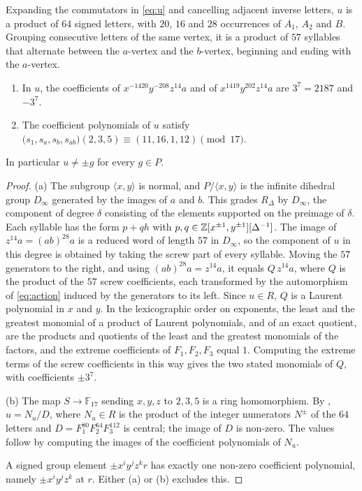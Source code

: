 \documentclass[11pt,colorlinks]{charlie}
\newcommand{\F}{\mathbb{F}}
\newcommand{\Dinf}{D_\infty}
\begin{document}
Expanding the commutators in \eqref{eq:u} and cancelling adjacent inverse letters, $u$ is a product of $64$ signed letters, with $20$, $16$ and $28$ occurrences of $A_1$, $A_2$ and $B$. Grouping consecutive letters of the same vertex, it is a product of $57$ syllables that alternate between the $a$-vertex and the $b$-vertex, beginning and ending with the $a$-vertex.

\begin{proposition}\label{prop:nontrivial}
\begin{enumerate}[label=\textup{(\alph*)}]
\item In $u$, the coefficients of $x^{-1420}y^{-208}z^{14}a$ and of $x^{1419}y^{202}z^{14}a$ are $3^7=2187$ and $-3^7$.
\item The coefficient polynomials of $u$ satisfy $\bigl(s_1,s_a,s_b,s_{ab}\bigr)(2,3,5)\equiv(11,16,1,12)\pmod{17}$.
\end{enumerate}
In particular $u\ne\pm g$ for every $g\in P$.
\end{proposition}

\begin{proof}
(a) The subgroup $\langle x,y\rangle$ is normal, and $P/\langle x,y\rangle$ is the infinite dihedral group $\Dinf$ generated by the images of $a$ and $b$. This grades $R_\Delta$ by $\Dinf$, the component of degree $\delta$ consisting of the elements supported on the preimage of $\delta$. Each syllable has the form $p+qh$ with $p,q\in\mathbb{Z}[x^{\pm1},y^{\pm1}][\Delta^{-1}]$. The image of $z^{14}a=(ab)^{28}a$ is a reduced word of length $57$ in $\Dinf$, so the component of $u$ in this degree is obtained by taking the screw part of every syllable. Moving the $57$ generators to the right, and using $(ab)^{28}a=z^{14}a$, it equals $Q\,z^{14}a$, where $Q$ is the product of the $57$ screw coefficients, each transformed by the automorphism of \eqref{eq:action} induced by the generators to its left. Since $u\in R$, $Q$ is a Laurent polynomial in $x$ and $y$. In the lexicographic order on exponents, the least and the greatest monomial of a product of Laurent polynomials, and of an exact quotient, are the products and quotients of the least and the greatest monomials of the factors, and the extreme coefficients of $F_1,F_2,F_3$ equal $1$. Computing the extreme terms of the screw coefficients in this way gives the two stated monomials of $Q$, with coefficients $\pm3^7$.

(b) The map $S\to\F_{17}$ sending $x,y,z$ to $2,3,5$ is a ring homomorphism. By , $u=N_u/D$, where $N_u\in R$ is the product of the integer numerators $N^\pm$ of the $64$ letters and $D=F_1^{80}F_2^{64}F_3^{112}$ is central; the image of $D$ is non-zero. The values follow by computing the images of the coefficient polynomials of $N_u$.

A signed group element $\pm x^iy^jz^kr$ has exactly one non-zero coefficient polynomial, namely $\pm x^iy^jz^k$ at $r$. Either (a) or (b) excludes this.
\end{proof}
\end{document}
